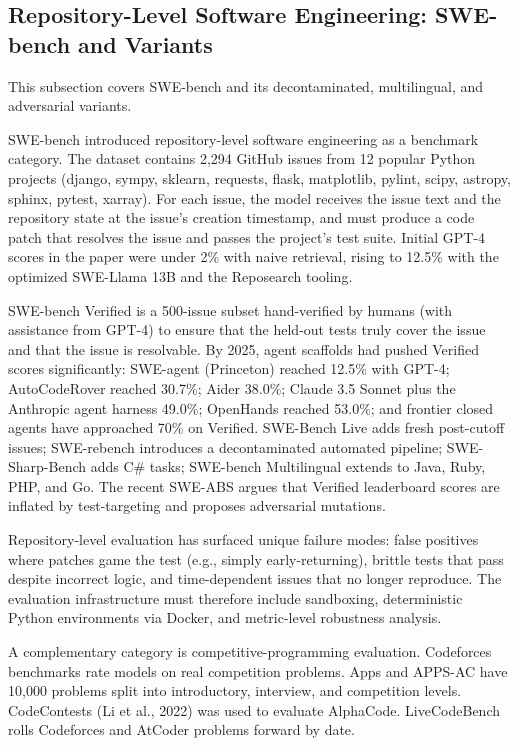 \documentclass{article}
\begin{document}
\subsection{Repository-Level Software Engineering: SWE-bench and Variants}\label{repository-level-software-engineering-swe-bench-and-variants}

This subsection covers SWE-bench and its decontaminated, multilingual, and adversarial variants.

SWE-bench \cite{jimenez20242024} introduced repository-level software engineering as a benchmark category. The dataset contains 2,294 GitHub issues from 12 popular Python projects (django, sympy, sklearn, requests, flask, matplotlib, pylint, scipy, astropy, sphinx, pytest, xarray). For each issue, the model receives the issue text and the repository state at the issue's creation timestamp, and must produce a code patch that resolves the issue and passes the project's test suite. Initial GPT-4 scores in the paper were under 2\% with naive retrieval, rising to 12.5\% with the optimized SWE-Llama 13B and the Reposearch tooling.

SWE-bench Verified is a 500-issue subset hand-verified by humans (with assistance from GPT-4) to ensure that the held-out tests truly cover the issue and that the issue is resolvable. By 2025, agent scaffolds had pushed Verified scores significantly: SWE-agent (Princeton) \cite{yang20242024} reached 12.5\% with GPT-4; AutoCodeRover reached 30.7\%; Aider 38.0\%; Claude 3.5 Sonnet plus the Anthropic agent harness 49.0\%; OpenHands \cite{wang20242024} reached 53.0\%; and frontier closed agents have approached 70\% on Verified. SWE-Bench Live \cite{zhang20252025} adds fresh post-cutoff issues; SWE-rebench \cite{badertdinov20252025} introduces a decontaminated automated pipeline; SWE-Sharp-Bench \cite{mhatre20252025} adds C\# tasks; SWE-bench Multilingual extends to Java, Ruby, PHP, and Go. The recent SWE-ABS \cite{yu20262026} argues that Verified leaderboard scores are inflated by test-targeting and proposes adversarial mutations.

Repository-level evaluation has surfaced unique failure modes: false positives where patches game the test (e.g., simply early-returning), brittle tests that pass despite incorrect logic, and time-dependent issues that no longer reproduce. The evaluation infrastructure must therefore include sandboxing, deterministic Python environments via Docker, and metric-level robustness analysis.

A complementary category is competitive-programming evaluation. Codeforces benchmarks rate models on real competition problems. Apps and APPS-AC have 10,000 problems split into introductory, interview, and competition levels. CodeContests (Li et al., 2022) was used to evaluate AlphaCode. LiveCodeBench rolls Codeforces and AtCoder problems forward by date.
\end{document}
